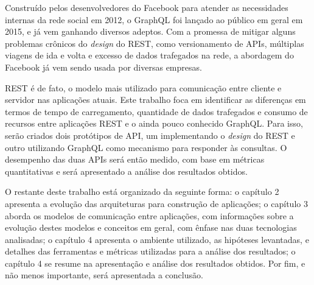 Construído pelos desenvolvedores do Facebook para atender as necessidades internas da rede social em 2012, o GraphQL foi lançado ao público em geral em 2015, e já vem ganhando diversos adeptos. Com a promessa de mitigar alguns problemas crônicos do \textit{design} do REST, como versionamento de APIs, múltiplas viagens de ida e volta e excesso de dados trafegados na rede, a abordagem do Facebook já vem sendo usada por diversas empresas.

REST é de fato, o modelo mais utilizado para comunicação entre cliente e servidor nas aplicações atuais. Este trabalho foca em identificar as diferenças em termos de tempo de carregamento, quantidade de dados trafegados e consumo de recursos entre aplicações REST e o ainda pouco conhecido GraphQL. Para isso, serão criados dois protótipos de API, um implementando o \textit{design} do REST e outro utilizando GraphQL como mecanismo para responder às consultas. O desempenho das duas APIs será então medido, com base em métricas quantitativas e será apresentado a análise dos resultados obtidos.

O restante deste trabalho está organizado da seguinte forma: o capítulo 2 apresenta a evolução das arquiteturas para construção de aplicações; o capítulo 3 aborda os modelos de comunicação entre aplicações, com informações sobre a evolução destes modelos e conceitos em geral, com ênfase nas duas tecnologias analisadas; o capítulo 4 apresenta o ambiente utilizado, as hipóteses levantadas, e detalhes das ferramentas e métricas utilizadas para a análise dos resultados; o capítulo 4 se resume na apresentação e análise dos resultados obtidos. Por fim, e não menos importante, será apresentada a conclusão.